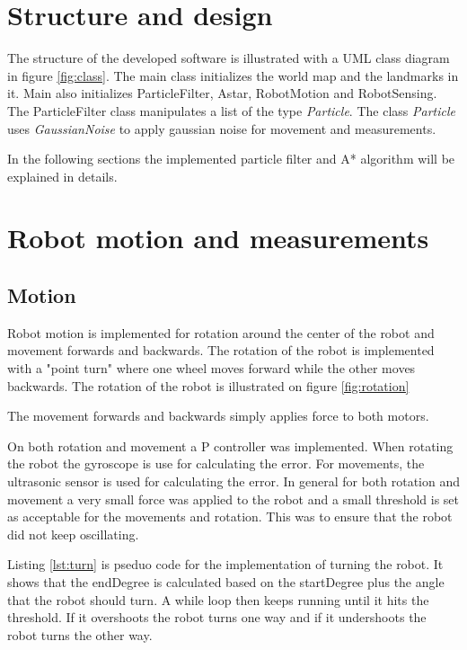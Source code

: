 \section{Structure and design}
The structure of the developed software is illustrated with a UML class diagram in figure \ref{fig:class}. The main class initializes the world map and the landmarks in it. Main also initializes ParticleFilter, Astar, RobotMotion and RobotSensing. The ParticleFilter class manipulates a list of the type \emph{Particle}. The class \emph{Particle} uses \emph{GaussianNoise} to apply gaussian noise for movement and measurements. 


In the following sections the implemented particle filter and A* algorithm will be explained in details.

\section{Robot motion and measurements}
\subsection{Motion}
Robot motion is implemented for rotation around the center of the robot and movement forwards and backwards. The rotation of the robot is implemented with a "point turn" where one wheel moves forward while the other moves backwards. The rotation of the robot is illustrated on figure \ref{fig:rotation}



The movement forwards and backwards simply applies force to both motors. 

On both rotation and movement a P controller was implemented. When rotating the robot the gyroscope is use for calculating the error. For movements, the ultrasonic sensor is used for calculating the error. In general for both rotation and movement a very small force was applied to the robot and a small threshold is set as acceptable for the movements and rotation. This was to ensure that the robot did not keep oscillating.

Listing \ref{lst:turn} is pseduo code for the implementation of turning the robot. It shows that the endDegree is calculated based on the startDegree plus the angle that the robot should turn. A while loop then keeps running until it hits the threshold. If it overshoots the robot turns one way and if it undershoots the robot turns the other way.

